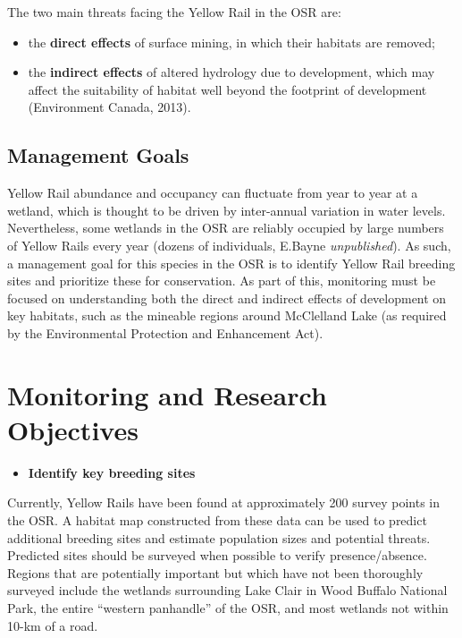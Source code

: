 \documentclass[11pt,]{article}
\providecommand{\tightlist}{%
  \setlength{\itemsep}{0pt}\setlength{\parskip}{0pt}}
\begin{document}
The two main threats facing the Yellow Rail in the OSR are:

\begin{itemize}
\tightlist
\item
  the \textbf{direct effects} of surface mining, in which their habitats
  are removed;
\item
  the \textbf{indirect effects} of altered hydrology due to development,
  which may affect the suitability of habitat well beyond the footprint
  of development (Environment Canada, 2013).
\end{itemize}

\subsection{Management Goals}\label{management-goals}

Yellow Rail abundance and occupancy can fluctuate from year to year at a
wetland, which is thought to be driven by inter-annual variation in
water levels. Nevertheless, some wetlands in the OSR are reliably
occupied by large numbers of Yellow Rails every year (dozens of
individuals, E.Bayne \emph{unpublished}). As such, a management goal for
this species in the OSR is to identify Yellow Rail breeding sites and
prioritize these for conservation. As part of this, monitoring must be
focused on understanding both the direct and indirect effects of
development on key habitats, such as the mineable regions around
McClelland Lake (as required by the Environmental Protection and
Enhancement Act).

\section{Monitoring and Research
Objectives}\label{monitoring-and-research-objectives}

\begin{itemize}
\tightlist
\item
  \textbf{Identify key breeding sites}
\end{itemize}

Currently, Yellow Rails have been found at approximately 200 survey
points in the OSR. A habitat map constructed from these data can be used
to predict additional breeding sites and estimate population sizes and
potential threats. Predicted sites should be surveyed when possible to
verify presence/absence. Regions that are potentially important but
which have not been thoroughly surveyed include the wetlands surrounding
Lake Clair in Wood Buffalo National Park, the entire ``western
panhandle'' of the OSR, and most wetlands not within 10-km of a road.
\end{document}

